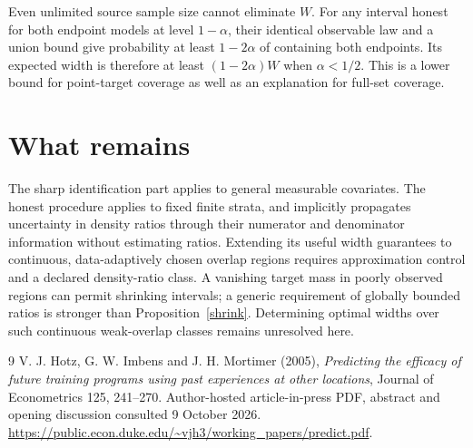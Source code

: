 \documentclass[11pt]{article}
\theoremstyle{remark}\newtheorem{remark}[theorem]{Remark}
\begin{document}
Even unlimited source sample size cannot eliminate $W$. For any interval honest for both endpoint models at level $1-\alpha$, their identical observable law and a union bound give probability at least $1-2\alpha$ of containing both endpoints. Its expected width is therefore at least $(1-2\alpha)W$ when $\alpha<1/2$. This is a lower bound for point-target coverage as well as an explanation for full-set coverage.

\section{What remains}
The sharp identification part applies to general measurable covariates. The honest procedure applies to fixed finite strata, and implicitly propagates uncertainty in density ratios through their numerator and denominator information without estimating ratios. Extending its useful width guarantees to continuous, data-adaptively chosen overlap regions requires approximation control and a declared density-ratio class. A vanishing target mass in poorly observed regions can permit shrinking intervals; a generic requirement of globally bounded ratios is stronger than Proposition~\ref{shrink}. Determining optimal widths over such continuous weak-overlap classes remains unresolved here.

\begin{thebibliography}{9}
 V. J. Hotz, G. W. Imbens and J. H. Mortimer (2005), \emph{Predicting the efficacy of future training programs using past experiences at other locations}, Journal of Econometrics 125, 241--270. Author-hosted article-in-press PDF, abstract and opening discussion consulted 9 October 2026. \url{https://public.econ.duke.edu/~vjh3/working_papers/predict.pdf}.
\end{thebibliography}
\end{document}
